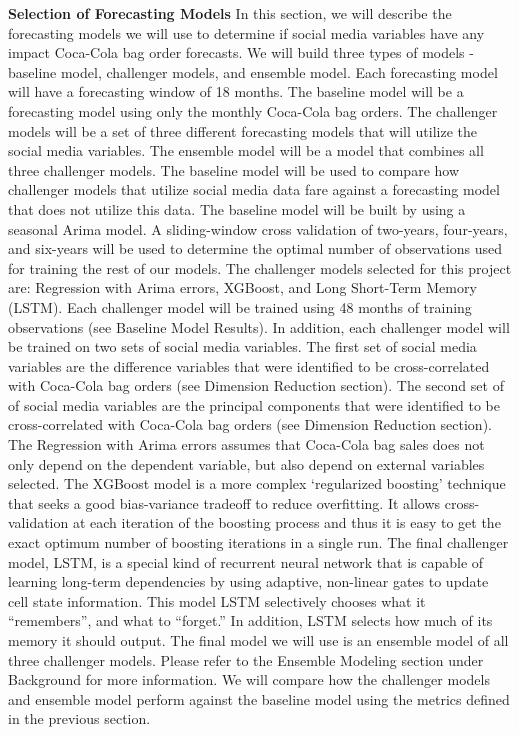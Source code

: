\documentclass[12pt,oneside]{chicagocapstone}
\begin{document}
\textbf{Selection of Forecasting Models} In this section, we will
describe the forecasting models we will use to determine if social media
variables have any impact Coca-Cola bag order forecasts. We will build
three types of models - baseline model, challenger models, and ensemble
model. Each forecasting model will have a forecasting window of 18
months. The baseline model will be a forecasting model using only the
monthly Coca-Cola bag orders. The challenger models will be a set of
three different forecasting models that will utilize the social media
variables. The ensemble model will be a model that combines all three
challenger models. The baseline model will be used to compare how
challenger models that utilize social media data fare against a
forecasting model that does not utilize this data. The baseline model
will be built by using a seasonal Arima model. A sliding-window cross
validation of two-years, four-years, and six-years will be used to
determine the optimal number of observations used for training the rest
of our models. The challenger models selected for this project are:
Regression with Arima errors, XGBoost, and Long Short-Term Memory
(LSTM). Each challenger model will be trained using 48 months of
training observations (see Baseline Model Results). In addition, each
challenger model will be trained on two sets of social media variables.
The first set of social media variables are the difference variables
that were identified to be cross-correlated with Coca-Cola bag orders
(see Dimension Reduction section). The second set of of social media
variables are the principal components that were identified to be
cross-correlated with Coca-Cola bag orders (see Dimension Reduction
section). The Regression with Arima errors assumes that Coca-Cola bag
sales does not only depend on the dependent variable, but also depend on
external variables selected. The XGBoost model is a more complex
`regularized boosting' technique that seeks a good bias-variance
tradeoff to reduce overfitting. It allows cross-validation at each
iteration of the boosting process and thus it is easy to get the exact
optimum number of boosting iterations in a single run. The final
challenger model, LSTM, is a special kind of recurrent neural network
that is capable of learning long-term dependencies by using adaptive,
non-linear gates to update cell state information. This model LSTM
selectively chooses what it ``remembers'', and what to ``forget.'' In
addition, LSTM selects how much of its memory it should output. The
final model we will use is an ensemble model of all three challenger
models. Please refer to the Ensemble Modeling section under Background
for more information. We will compare how the challenger models and
ensemble model perform against the baseline model using the metrics
defined in the previous section.
\end{document}
